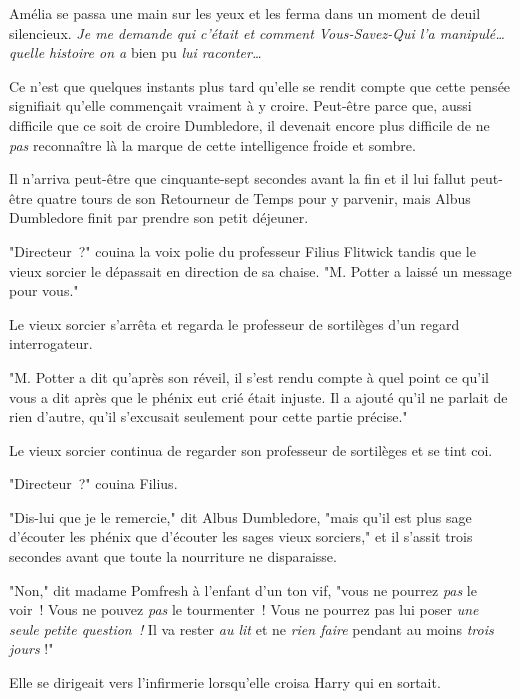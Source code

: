 Amélia se passa une main sur les yeux et les ferma dans un moment de deuil silencieux. \emph{Je me demande qui c'était et comment Vous-Savez-Qui l'a manipulé… quelle histoire on a} bien pu \emph{lui raconter…}

Ce n'est que quelques instants plus tard qu'elle se rendit compte que cette pensée signifiait qu'elle commençait vraiment à y croire. Peut-être parce que, aussi difficile que ce soit de croire Dumbledore, il devenait encore plus difficile de ne \emph{pas} reconnaître là la marque de cette intelligence froide et sombre.


Il n'arriva peut-être que cinquante-sept secondes avant la fin et il lui fallut peut-être quatre tours de son Retourneur de Temps pour y parvenir, mais Albus Dumbledore finit par prendre son petit déjeuner.

"Directeur~?" couina la voix polie du professeur Filius Flitwick tandis que le vieux sorcier le dépassait en direction de sa chaise. "M. Potter a laissé un message pour vous."

Le vieux sorcier s'arrêta et regarda le professeur de sortilèges d'un regard interrogateur.

"M. Potter a dit qu'après son réveil, il s'est rendu compte à quel point ce qu'il vous a dit après que le phénix eut crié était injuste. Il a ajouté qu'il ne parlait de rien d'autre, qu'il s'excusait seulement pour cette partie précise."

Le vieux sorcier continua de regarder son professeur de sortilèges et se tint coi.

"Directeur~?" couina Filius.

"Dis-lui que je le remercie," dit Albus Dumbledore, "mais qu'il est plus sage d'écouter les phénix que d'écouter les sages vieux sorciers," et il s'assit trois secondes avant que toute la nourriture ne disparaisse.


"Non," dit madame Pomfresh à l'enfant d'un ton vif, "vous ne pourrez \emph{pas} le voir~! Vous ne pouvez \emph{pas} le tourmenter~! Vous ne pourrez pas lui poser \emph{une seule petite question~!} Il va rester \emph{au lit} et ne \emph{rien faire} pendant au moins \emph{trois jours} !"


Elle se dirigeait vers l'infirmerie lorsqu'elle croisa Harry qui en sortait.

